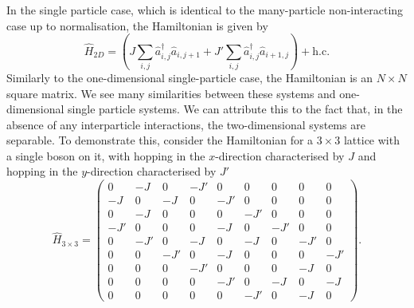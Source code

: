 \documentclass[a4paper, 10pt]{article}
\theoremstyle{plain}
\begin{document}
In the single particle case, which is identical to the many-particle
non-interacting case up to normalisation, the Hamiltonian is given by
\begin{equation}
    \hat{H}_{2D}
    =
    \left (
        J \sum_{i,j}{\hat{a}^{\dagger}_{i,j} \hat{a}_{i,j+1}} +
        J'\sum_{i,j}{\hat{a}^{\dagger}_{i,j}   \hat{a}_{i+1,j}}
    \right )
    +
    \text{h.c.}
\end{equation}
Similarly to the one-dimensional single-particle case, the Hamiltonian is an $N
\times N$ square matrix. We see many similarities between these systems and
one-dimensional single particle systems. We can attribute this to the fact that,
in the absence of any interparticle interactions, the two-dimensional systems
are separable. To demonstrate this, consider the Hamiltonian for a $3 \times 3$
lattice with a single boson on it, with hopping in the $x$-direction
characterised by $J$ and hopping in the $y$-direction characterised by $J'$
\begin{equation}
    \hat{H}_{3\times3}
    =
    \begin{pmatrix}
         0  & -J  &  0  & -J' &  0  &  0  &  0  &  0  &  0  \\
        -J  &  0  & -J  &  0  & -J' &  0  &  0  &  0  &  0  \\
         0  & -J  &  0  &  0  &  0  & -J' &  0  &  0  &  0  \\
        -J' &  0  &  0  &  0  & -J  &  0  & -J' &  0  &  0  \\
         0  & -J' &  0  & -J  &  0  & -J  &  0  & -J' &  0  \\
         0  &  0  & -J' &  0  & -J  &  0  &  0  &  0  & -J' \\
         0  &  0  &  0  & -J' &  0  &  0  &  0  & -J  &  0  \\
         0  &  0  &  0  &  0  & -J' &  0  & -J  &  0  & -J  \\
         0  &  0  &  0  &  0  &  0  & -J' &  0  & -J  &  0
    \end{pmatrix}.
\end{equation}
\end{document}
